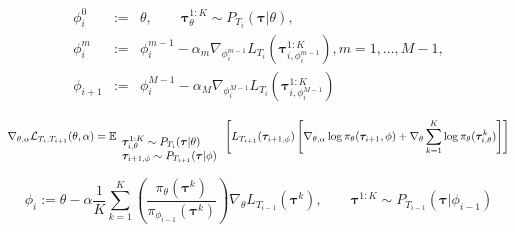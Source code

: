 \documentclass[12pt,a4paper]{article}
\begin{document}
\begin{equation}
\label{equat_7}
\begin{array}{rcl}
\phi_{i}^{0} & := & \theta, \qquad \bm{\tau}_{\theta}^{1:K} \sim P_{T_i}(\bm{\tau}|\theta), \\
\phi_{i}^{m} & := & \phi_{i}^{m-1} - \alpha_m\nabla_{\phi_i^{m-1}}L_{T_i}\left(\bm{\tau}_{i, \phi_{i}^{m-1}}^{1:K}\right), m = 1, ..., M-1,\\
\phi_{i+1} & := & \phi_{i}^{M-1} - \alpha_{M}\nabla_{\phi_i^{M-1}}L_{T_{i}}\left( \bm{\tau}_{i, \phi_{i}^{M-1}}^{1:K} \right)
\end{array}
\end{equation}

\begin{equation}
\label{equat_8}
\nabla_{\theta, \alpha}\mathcal{L}_{T_i, T_{i+1}}(\theta, \alpha) = \\
 \mathbb{E}_{
\begin{array}{l}
\bm{\tau}_{i, \theta}^{1:K} \sim P_{T_{i}}(\bm{\tau}|\theta) \\
\bm{\tau}_{i+1, \phi} \sim P_{T_{i+1}}(\bm{\tau}|\phi)
\end{array}}\left[ L_{T_{i+1}}(\bm{\tau}_{i+1, \phi}) \left[ \nabla_{\theta, \alpha} \log \pi_{\theta}(\bm{\tau}_{i+1}, \phi) + \nabla_{\theta}\sum\limits_{k=1}^{K} \log\pi_{\theta}(\bm{\tau}_{i, \theta}^{k}) \right] \right]
\end{equation}

\begin{equation}
\label{equat_9}
\phi_{i} := \theta - \alpha \frac{1}{K}\sum\limits_{k=1}^{K}\left( \frac{\pi_{\theta}(\bm{\tau}^{k})}{\pi_{\phi_{i-1}}(\bm{\tau}^{k})}\right) \nabla_{\theta}L_{T_{i-1}}(\bm{\tau}^{k}), \qquad \bm{\tau}^{1:K} \sim P_{T_{i-1}}(\bm{\tau}|\phi_{i-1})
\end{equation}
%


\end{document}
